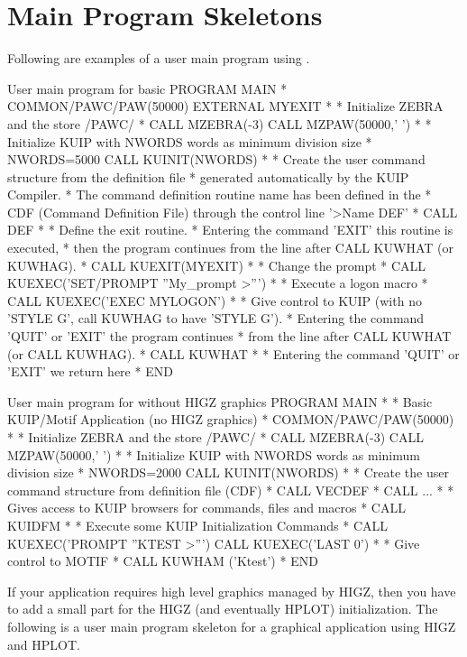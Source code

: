 \condbreak{.5\textheight}
\section{Main Program Skeletons}

Following are examples of a user main program using \KUIP{}.

\begin{XMPt}{User main program for basic \KUIP{}}
      PROGRAM MAIN
*
      COMMON/PAWC/PAW(50000)
      EXTERNAL MYEXIT
*
* Initialize ZEBRA and the store /PAWC/
*
      CALL MZEBRA(-3)
      CALL MZPAW(50000,' ')
*
* Initialize KUIP with NWORDS words as minimum division size
*
      NWORDS=5000
      CALL KUINIT(NWORDS)
*
* Create the user command structure from the definition file
* generated automatically by the KUIP Compiler.
* The command definition routine name has been defined in the
* CDF (Command Definition File) through the control line '>Name DEF'
*
      CALL DEF
*
* Define the exit routine.
* Entering the command 'EXIT' this routine is executed,
* then the program continues from the line after CALL KUWHAT (or KUWHAG).
*
      CALL KUEXIT(MYEXIT)
*
* Change the prompt
*
      CALL KUEXEC('SET/PROMPT ''My_prompt >''')
*
* Execute a logon macro
*
      CALL KUEXEC('EXEC MYLOGON')
*
* Give control to KUIP (with no 'STYLE G', call KUWHAG to have 'STYLE G').
* Entering the command 'QUIT' or 'EXIT' the program continues
* from the line after CALL KUWHAT (or CALL KUWHAG).
*
      CALL KUWHAT
*
* Entering the command 'QUIT' or 'EXIT' we return here
*
      END
\end{XMPt}


\begin{XMPt}{User main program for \KUIPMotif{} without HIGZ graphics}
      PROGRAM MAIN
*
* Basic KUIP/Motif Application (no HIGZ graphics)
*
      COMMON/PAWC/PAW(50000)
*
* Initialize ZEBRA and the store /PAWC/
*
      CALL MZEBRA(-3)
      CALL MZPAW(50000,' ')
*
* Initialize KUIP with NWORDS words as minimum division size
*
      NWORDS=2000
      CALL KUINIT(NWORDS)
*
* Create the user command structure from definition file (CDF)
*
      CALL VECDEF
*     CALL ...
*
* Gives access to KUIP browsers for commands, files and macros
*
      CALL KUIDFM
*
* Execute some KUIP Initialization Commands
*
      CALL KUEXEC('PROMPT ''KTEST >''')
      CALL KUEXEC('LAST 0')
*
* Give control to MOTIF
*
      CALL KUWHAM ('Ktest')
*
      END
\end{XMPt}

If your application requires high level graphics managed by HIGZ, then you
have to add a small part for the HIGZ (and eventually
HPLOT) initialization.  The following is a user main program skeleton
for a graphical application using HIGZ and HPLOT.


